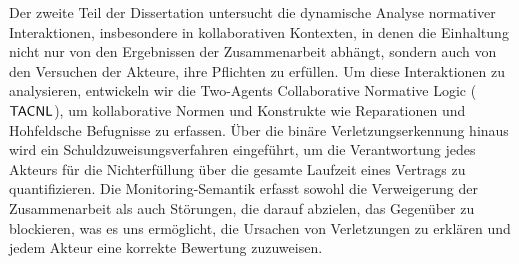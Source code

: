 Der zweite Teil der Dissertation untersucht die dynamische Analyse normativer Interaktionen, insbesondere in kollaborativen Kontexten, in denen die Einhaltung nicht nur von den Ergebnissen der Zusammenarbeit abhängt, sondern auch von den Versuchen der Akteure, ihre Pflichten zu erfüllen. Um diese Interaktionen zu analysieren, entwickeln wir die Two-Agents Collaborative Normative Logic ($\mathsf{TACNL}$), um kollaborative Normen und Konstrukte wie Reparationen und Hohfeldsche Befugnisse zu erfassen. Über die binäre Verletzungserkennung hinaus wird ein Schuldzuweisungsverfahren eingeführt, um die Verantwortung jedes Akteurs für die Nichterfüllung über die gesamte Laufzeit eines Vertrags zu quantifizieren. Die Monitoring-Semantik erfasst sowohl die Verweigerung der Zusammenarbeit als auch Störungen, die darauf abzielen, das Gegenüber zu blockieren, was es uns ermöglicht, die Ursachen von Verletzungen zu erklären und jedem Akteur eine korrekte Bewertung zuzuweisen.






